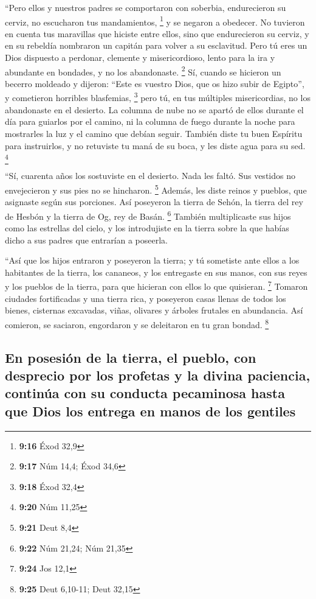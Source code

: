  ``Pero ellos y nuestros padres se comportaron con
soberbia, endurecieron su cerviz, no escucharon tus mandamientos,
\footnote{\textbf{9:16} Éxod 32,9}  y se negaron a
obedecer. No tuvieron en cuenta tus maravillas que hiciste entre ellos,
sino que endurecieron su cerviz, y en su rebeldía nombraron un capitán
para volver a su esclavitud. Pero tú eres un Dios dispuesto a perdonar,
clemente y misericordioso, lento para la ira y abundante en bondades, y
no los abandonaste. \footnote{\textbf{9:17} Núm 14,4; Éxod 34,6}
 Sí, cuando se hicieron un becerro moldeado y dijeron:
``Este es vuestro Dios, que os hizo subir de Egipto'', y cometieron
horribles blasfemias, \footnote{\textbf{9:18} Éxod 32,4} 
pero tú, en tus múltiples misericordias, no los abandonaste en el
desierto. La columna de nube no se apartó de ellos durante el día para
guiarlos por el camino, ni la columna de fuego durante la noche para
mostrarles la luz y el camino que debían seguir.  También
diste tu buen Espíritu para instruirlos, y no retuviste tu maná de su
boca, y les diste agua para su sed. \footnote{\textbf{9:20} Núm 11,25}

 ``Sí, cuarenta años los sostuviste en el desierto. Nada
les faltó. Sus vestidos no envejecieron y sus pies no se hincharon.
\footnote{\textbf{9:21} Deut 8,4}  Además, les diste
reinos y pueblos, que asignaste según sus porciones. Así poseyeron la
tierra de Sehón, la tierra del rey de Hesbón y la tierra de Og, rey de
Basán. \footnote{\textbf{9:22} Núm 21,24; Núm 21,35} 
También multiplicaste sus hijos como las estrellas del cielo, y los
introdujiste en la tierra sobre la que habías dicho a sus padres que
entrarían a poseerla.

 ``Así que los hijos entraron y poseyeron la tierra; y tú
sometiste ante ellos a los habitantes de la tierra, los cananeos, y los
entregaste en sus manos, con sus reyes y los pueblos de la tierra, para
que hicieran con ellos lo que quisieran. \footnote{\textbf{9:24} Jos
  12,1}  Tomaron ciudades fortificadas y una tierra rica,
y poseyeron casas llenas de todos los bienes, cisternas excavadas,
viñas, olivares y árboles frutales en abundancia. Así comieron, se
saciaron, engordaron y se deleitaron en tu gran bondad. \footnote{\textbf{9:25}
  Deut 6,10-11; Deut 32,15}

\hypertarget{en-posesiuxf3n-de-la-tierra-el-pueblo-con-desprecio-por-los-profetas-y-la-divina-paciencia-continuxfaa-con-su-conducta-pecaminosa-hasta-que-dios-los-entrega-en-manos-de-los-gentiles}{%
\subsection{En posesión de la tierra, el pueblo, con desprecio por los
profetas y la divina paciencia, continúa con su conducta pecaminosa
hasta que Dios los entrega en manos de los
gentiles}\label{en-posesiuxf3n-de-la-tierra-el-pueblo-con-desprecio-por-los-profetas-y-la-divina-paciencia-continuxfaa-con-su-conducta-pecaminosa-hasta-que-dios-los-entrega-en-manos-de-los-gentiles}}

